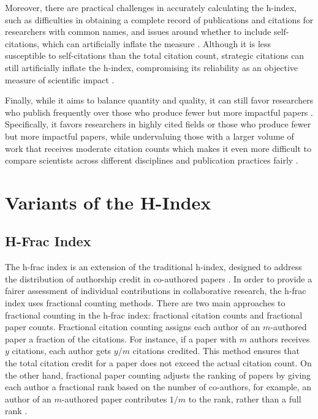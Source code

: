 Moreover, there are practical challenges in accurately calculating the h-index,
such as difficulties in obtaining a complete record of publications and
citations for researchers with common names, and issues around whether to
include self-citations, which can artificially inflate the measure
\cite{costas2007h,norris2010h,bartneck2011detecting}. Although it is less
susceptible to self-citations than the total citation count, strategic
citations can still artificially inflate the h-index, compromising its
reliability as an objective measure of scientific impact
\cite{hirsch2005index,bornmann2007what,costas2007h,waltman2012inconsistency,norris2010h,egghe2010hirsch,hirsch2014meaning,bartneck2011detecting}.

Finally, while it aims to balance quantity and quality, it can still favor
researchers who publish frequently over those who produce fewer but more
impactful papers
\cite{hirsch2005index,costas2007h,waltman2012inconsistency,norris2010h,egghe2010hirsch,hirsch2014meaning}.
Specifically, it favors researchers in highly cited fields or those who produce
fewer but more impactful papers, while undervaluing those with a larger volume
of work that receives moderate citation counts which makes it even more
difficult to compare scientists across different disciplines and publication
practices fairly
\cite{hirsch2005index,costas2007h,waltman2012inconsistency,egghe2010hirsch}.

\section{Variants of the H-Index}
\subsection{H-Frac Index}
The h-frac index is an extension of the traditional h-index, designed to
address the distribution of authorship credit in co-authored papers
\cite{egghe2008mathematical}. In order to provide a fairer assessment of
individual contributions in collaborative research, the h-frac index uses
fractional counting methods. There are two main approaches to fractional
counting in the h-frac index: fractional citation counts and fractional paper
counts. Fractional citation counting assigns each author of an $m$-authored
paper a fraction of the citations. For instance, if a paper with $m$ authors
receives $y$ citations, each author gets $y/m$ citations credited. This method
ensures that the total citation credit for a paper does not exceed the actual
citation count. On the other hand, fractional paper counting adjusts the
ranking of papers by giving each author a fractional rank based on the number
of co-authors, for example, an author of an $m$-authored paper contributes
$1/m$ to the rank, rather than a full rank
\cite{egghe2008mathematical,bihari2018h}.

